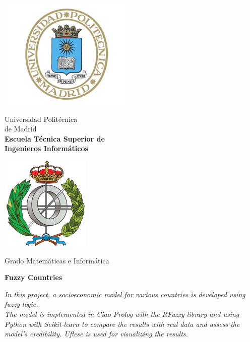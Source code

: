 \begin{titlepage}

\begin{minipage}{0.15\linewidth}
\hspace*{-15mm}
\noindent
\includegraphics[scale=0.5]{front-page/escudo_upm.png}
\end{minipage}
\begin{minipage}{0.7\linewidth}
\begin{center}
\huge{ Universidad Politécnica\\de Madrid }\\
\vspace*{0.5cm}
\Large{\textbf{Escuela Técnica Superior de \\
Ingenieros Informáticos}}
\end{center}
\end{minipage}
\begin{minipage}{0.2\linewidth}
\includegraphics[scale=0.5]{front-page/escudo_etsiinf.png}
\end{minipage}

\vspace*{1cm}
\begin{center}
\Large{Grado Matemáticas e Informática}
\end{center}

\vspace*{2.5cm}
\begin{center}
\huge\bfseries {Fuzzy Countries}
\end{center}

\vspace*{2cm}
\begin{center}
\textit{In this project, a socioeconomic model for various countries is developed using fuzzy logic.
\\The model is implemented in Ciao Prolog with the RFuzzy library and using Python with Scikit-learn to compare the results with real data and assess the model's credibility. Uflese is used for visualizing the results.} 
\end{center}


\end{titlepage}

